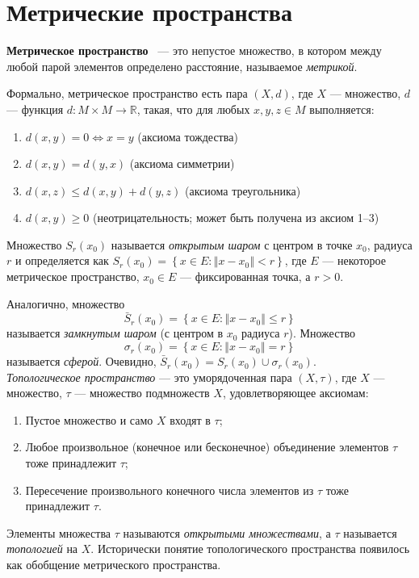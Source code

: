 \section{Метрические пространства}\label{sec:q-1}
\textbf{Метрическое пространство} ~--- это непустое множество, в котором между любой парой элементов определено расстояние, называемое \textit{метрикой}\cite[с.~18]{trenogin}.

Формально, метрическое пространство есть пара $(X, d)$, где $X$ --- множество, $d$ --- функция $d \colon M \times M \to \mathbb{R}$, такая, что для любых $x,y,z\in M$ выполняется:
\begin{enumerate}
	\itemsep0em
	\item ${\displaystyle d(x,y)=0\Leftrightarrow x=y}$ (аксиома тождества)
	\item ${\displaystyle d(x,y)=d(y,x)}$ (аксиома симметрии)
	\item ${\displaystyle d(x,z)\leqslant d(x,y)+d(y,z)}$ (аксиома треугольника)
	\item $d(x,y)\geqslant 0$ (неотрицательность; может быть получена из аксиом 1--3)
\end{enumerate}

Множество $S_r(x_0)$ называется \textit{открытым шаром} с центром в точке $x_0$, радиуса $r$ и определяется как $S_r(x_0)=\left\{x \in E\colon \left\Vert x - x_0 \right\Vert < r\right\}$, где $E$ --- некоторое метрическое пространство, $x_0 \in E$ --- фиксированная точка, а $r > 0$.

Аналогично, множество
$$\bar{S}_r(x_0)=\left\{x \in E\colon \left\Vert x - x_0 \right\Vert \leqslant r\right\}$$
называется \textit{замкнутым шаром} (с центром в $x_0$ радиуса $r$). Множество
$$\sigma_r(x_0)=\left\{x \in E\colon \left\Vert x - x_0 \right\Vert = r\right\}$$
называется \textit{сферой}. Очевидно, $\bar{S}_r(x_0)=S_r(x_0) \cup \sigma_r(x_0)$.\\

\textit{Топологическое пространство} --- это уморядоченная пара $(X, \tau)$, где $X$ --- множество, $\tau$ --- множество подмножеств $X$, удовлетворяющее аксиомам:
\begin{enumerate}
	\itemsep0em
	\item Пустое множество и само $X$ входят в $\tau$;
	\item Любое произвольное (конечное или бесконечное) объединение элементов $\tau$ тоже принадлежит $\tau$;
	\item Пересечение произвольного конечного числа элементов из $\tau$ тоже принадлежит $\tau$.
\end{enumerate}
Элементы множества $\tau$ называются \textit{открытыми множествами}, а $\tau$ называется \textit{топологией} на $X$. Исторически понятие топологического пространства появилось как обобщение метрического пространства.
